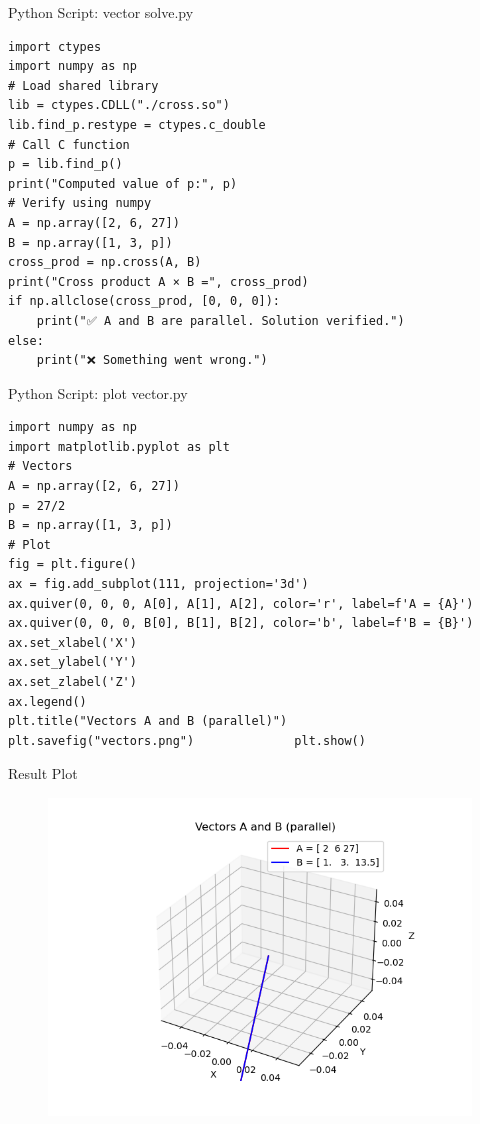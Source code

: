 \documentclass{beamer}
\numberwithin{equation}{section}
\theoremstyle{remark}
\begin{document}
\begin{frame}[fragile]{Python Script: vector solve.py}
\begin{verbatim}
import ctypes
import numpy as np
# Load shared library
lib = ctypes.CDLL("./cross.so")
lib.find_p.restype = ctypes.c_double
# Call C function
p = lib.find_p()
print("Computed value of p:", p)
# Verify using numpy
A = np.array([2, 6, 27])
B = np.array([1, 3, p])
cross_prod = np.cross(A, B)
print("Cross product A × B =", cross_prod)
if np.allclose(cross_prod, [0, 0, 0]):
    print("✅ A and B are parallel. Solution verified.")
else:
    print("❌ Something went wrong.")
\end{verbatim}
\end{frame}


\begin{frame}[fragile]{Python Script: plot vector.py}
\begin{verbatim}
import numpy as np
import matplotlib.pyplot as plt
# Vectors
A = np.array([2, 6, 27])
p = 27/2
B = np.array([1, 3, p])
# Plot
fig = plt.figure()
ax = fig.add_subplot(111, projection='3d')
ax.quiver(0, 0, 0, A[0], A[1], A[2], color='r', label=f'A = {A}')
ax.quiver(0, 0, 0, B[0], B[1], B[2], color='b', label=f'B = {B}')
ax.set_xlabel('X')
ax.set_ylabel('Y')
ax.set_zlabel('Z')
ax.legend()
plt.title("Vectors A and B (parallel)")
plt.savefig("vectors.png")              plt.show()

\end{verbatim}
\end{frame}

\begin{frame}{Result Plot}
 \begin{figure}[H]
     \centering
     \includegraphics[width=0.5\columnwidth]{figs/fig1.png}
     \caption*{}
     \label{fig:fig1}
 \end{figure}
 
\end{frame}
\end{document}
